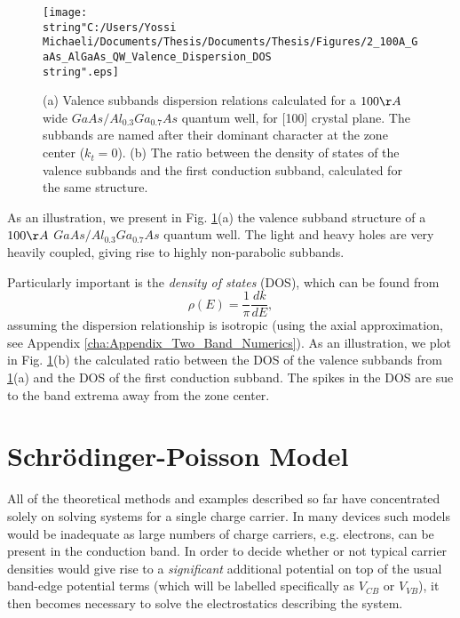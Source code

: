 \begin{figure}
\begin{centering}
\texttt{[image: \\string"C:/Users/Yossi Michaeli/Documents/Thesis/Documents/Thesis/Figures/2\_100A\_GaAs\_AlGaAs\_QW\_Valence\_Dispersion\_DOS\\string".eps]}
\par\end{centering}

\caption{\label{fig:QW_Valence_Subbands_DOS}(a) Valence subbands dispersion
relations calculated for a $100\AA$ wide $GaAs/Al_{0.3}Ga_{0.7}As$
quantum well, for {[}100{]} crystal plane. The subbands are named
after their dominant character at the zone center ($k_{t}=0$). (b)
The ratio between the density of states of the valence subbands and
the first conduction subband, calculated for the same structure. }

\end{figure}


As an illustration, we present in Fig. \ref{fig:QW_Valence_Subbands_DOS}(a)
the valence subband structure of a $100\AA$ $GaAs/Al_{0.3}Ga_{0.7}As$
quantum well. The light and heavy holes are very heavily coupled,
giving rise to highly non-parabolic subbands. 

Particularly important is the \emph{density of states} (DOS), which
can be found from \begin{equation}
\rho(E)=\frac{1}{\pi}\frac{dk}{dE},\end{equation}
assuming the dispersion relationship is isotropic (using the axial
approximation, see Appendix \ref{cha:Appendix_Two_Band_Numerics}).
As an illustration, we plot in Fig. \ref{fig:QW_Valence_Subbands_DOS}(b)
the calculated ratio between the DOS of the valence subbands from
\ref{fig:QW_Valence_Subbands_DOS}(a) and the DOS of the first conduction
subband. The spikes in the DOS are sue to the band extrema away from
the zone center.


\section{Schr\"{o}dinger-Poisson Model}

All of the theoretical methods and examples described so far have
concentrated solely on solving systems for a single charge carrier.
In many devices such models would be inadequate as large numbers of
charge carriers, e.g. electrons, can be present in the conduction
band. In order to decide whether or not typical carrier densities
would give rise to a \emph{significant} additional potential on top
of the usual band-edge potential terms (which will be labelled specifically
as $V_{CB}$ or $V_{VB}$), it then becomes necessary to solve the
electrostatics describing the system. 

